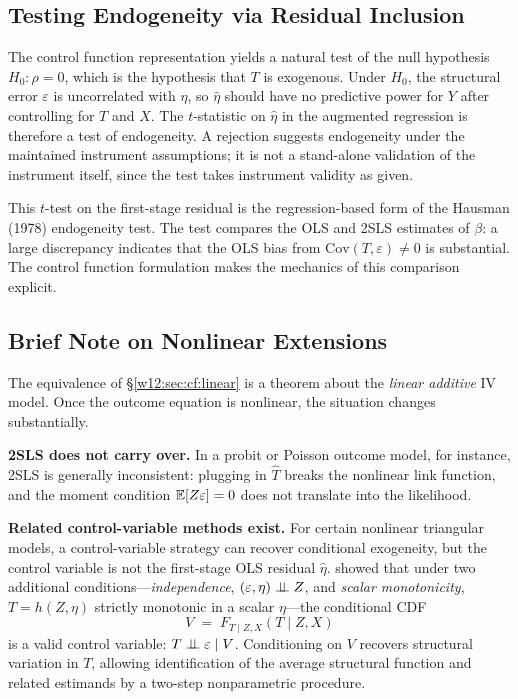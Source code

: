 \documentclass[master.tex]{subfiles}
\begin{document}
\subsection{Testing Endogeneity via Residual Inclusion}

The control function representation yields a natural test of the null
hypothesis $H_0\colon \rho = 0$, which is the hypothesis that $T$ is
exogenous.  Under $H_0$, the structural error $\varepsilon$ is
uncorrelated with $\eta$, so $\hat\eta$ should have no predictive power
for $Y$ after controlling for $T$ and $X$.  The $t$-statistic on
$\hat\eta$ in the augmented regression is therefore a test of
endogeneity.  A rejection suggests endogeneity under the maintained
instrument assumptions; it is not a stand-alone validation of the
instrument itself, since the test takes instrument validity as given.

\begin{remark}
This $t$-test on the first-stage residual is the regression-based
form of the Hausman (1978) endogeneity test.  The test compares the
OLS and 2SLS estimates of $\beta$: a large discrepancy indicates
that the OLS bias from $\mathrm{Cov}(T, \varepsilon) \neq 0$ is
substantial.  The control function formulation makes the mechanics
of this comparison explicit.
\end{remark}

\subsection{Brief Note on Nonlinear Extensions}
\label{w12:sec:cf:nonlinear}

The equivalence of §\ref{w12:sec:cf:linear} is a theorem about the
\emph{linear additive} IV model.  Once the outcome equation is nonlinear,
the situation changes substantially.

\textbf{2SLS does not carry over.}  In a probit or Poisson outcome
model, for instance, 2SLS is generally inconsistent: plugging in
$\hat T$ breaks the nonlinear link function, and the moment condition
$\mathbb{E}[Z\varepsilon] = 0$ does not translate into the likelihood.

\textbf{Related control-variable methods exist.}  For certain
nonlinear triangular models, a control-variable strategy can recover
conditional exogeneity, but the control variable is not the first-stage
OLS residual $\hat\eta$.  \citet{imbens2009} showed that under two
additional conditions---\emph{independence}, $(\varepsilon, \eta) \perp\!\!\!\perp Z$,
and \emph{scalar monotonicity}, $T = h(Z, \eta)$ strictly monotonic in a
scalar $\eta$---the conditional CDF
\begin{equation}
  V \;=\; F_{T \mid Z, X}(T \mid Z, X)
  \label{w12:eq:cf-control-var}
\end{equation}
is a valid control variable: $T \perp\!\!\!\perp \varepsilon \mid V$.
Conditioning on $V$ recovers structural variation in $T$, allowing
identification of the average structural function and related estimands
by a two-step nonparametric procedure.
\end{document}
